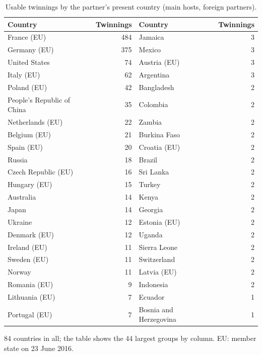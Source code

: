 \documentclass[11pt,a4paper]{article}
\begin{document}
\begin{table}[H]\centering\scriptsize\begin{threeparttable}\caption{Usable twinnings by the partner's present country (main hosts, foreign partners).}\label{tab:country}\begin{tabular}{lrlr}\toprule Country & Twinnings & Country & Twinnings\\\midrule
France (EU) & 484 & Jamaica & 3\\
Germany (EU) & 375 & Mexico & 3\\
United States & 74 & Austria (EU) & 3\\
Italy (EU) & 62 & Argentina & 3\\
Poland (EU) & 42 & Bangladesh & 2\\
People's Republic of China & 35 & Colombia & 2\\
Netherlands (EU) & 22 & Zambia & 2\\
Belgium (EU) & 21 & Burkina Faso & 2\\
Spain (EU) & 20 & Croatia (EU) & 2\\
Russia & 18 & Brazil & 2\\
Czech Republic (EU) & 16 & Sri Lanka & 2\\
Hungary (EU) & 15 & Turkey & 2\\
Australia & 14 & Kenya & 2\\
Japan & 14 & Georgia & 2\\
Ukraine & 12 & Estonia (EU) & 2\\
Denmark (EU) & 12 & Uganda & 2\\
Ireland (EU) & 11 & Sierra Leone & 2\\
Sweden (EU) & 11 & Switzerland & 2\\
Norway & 11 & Latvia (EU) & 2\\
Romania (EU) & 9 & Indonesia & 2\\
Lithuania (EU) & 7 & Ecuador & 1\\
Portugal (EU) & 7 & Bosnia and Herzegovina & 1\\
\bottomrule\end{tabular}\begin{tablenotes}\footnotesize\item 84 countries in all; the table shows the 44 largest groups by column. EU: member state on 23 June 2016.\end{tablenotes}\end{threeparttable}\end{table}
\end{document}
